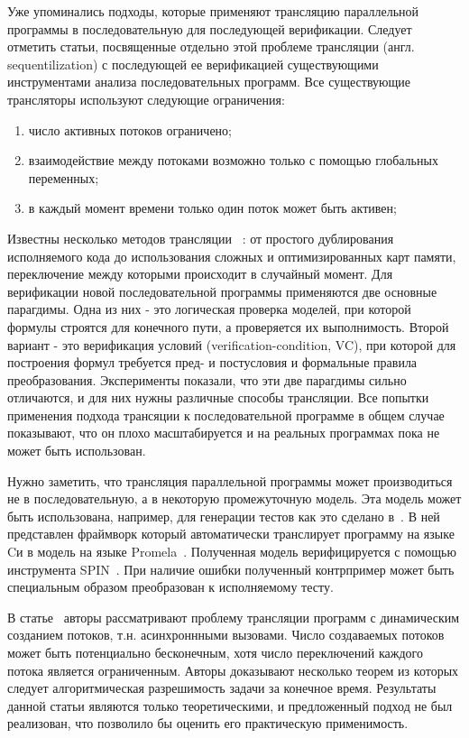 Уже упоминались подходы, которые применяют трансляцию параллельной программы в последовательную для последующей верификации.
Следует отметить статьи, посвященные отдельно этой проблеме трансляции (англ. sequentilization) с последующей ее верификацией существующими инструментами анализа последовательных программ.
Все существующие трансляторы используют следующие ограничения: 
\begin{enumerate}
\item число активных потоков ограничено;
\item взаимодействие между потоками возможно только с помощью глобальных переменных;
\item в каждый момент времени только один поток может быть активен;
\end{enumerate}
Известны несколько методов трансляции ~\cite{Torre:2009, Ghafari:2010,Inverso:2014, Tomasco:2015}: от простого дублирования исполняемого кода до использования сложных и оптимизированных карт памяти, переключение между которыми происходит в случайный момент.
Для верификации новой последовательной программы применяются две основные парагдимы. Одна из них - это логическая проверка моделей, при которой формулы строятся для конечного пути, а проверяется их выполнимость.
Второй вариант - это верификация условий (verification-condition, VC), при которой для построения формул требуется пред- и постусловия и формальные правила преобразования. Эксперименты показали, что эти две парагдимы сильно отличаются, и для них нужны различные способы трансляции. 
Все попытки применения подхода трансяции к последовательной программе в общем случае показывают, что он плохо масштабируется и на реальных программах пока не может быть использован. 

Нужно заметить, что трансляция параллельной программы может производиться не в последовательную, а в некоторую промежуточную модель.
Эта модель может быть использована, например, для генерации тестов как это сделано в~\cite{KIM200921}.
В ней представлен фраймворк который автоматически транслирует программу на языке Cи в модель на языке Promela~\cite{SPIN}.
Полученная модель верифицируется с помощью инструмента SPIN~\cite{SPIN}.
При наличие ошибки полученный контрпример может быть специальным образом преобразован к исполняемому тесту.

В статье~\cite{Atig:2009} авторы рассматривают проблему трансляции программ с динамическим созданием потоков, т.н. асинхроннными вызовами.
Число создаваемых потоков может быть потенциально бесконечным, хотя число переключений каждого потока является ограниченным.
Авторы доказывают несколько теорем из которых следует алгоритмическая разрешимость задачи за конечное время.
Результаты данной статьи являются только теоретическими, и предложенный подход не был реализован, что позволило бы оценить его практическую применимость.

